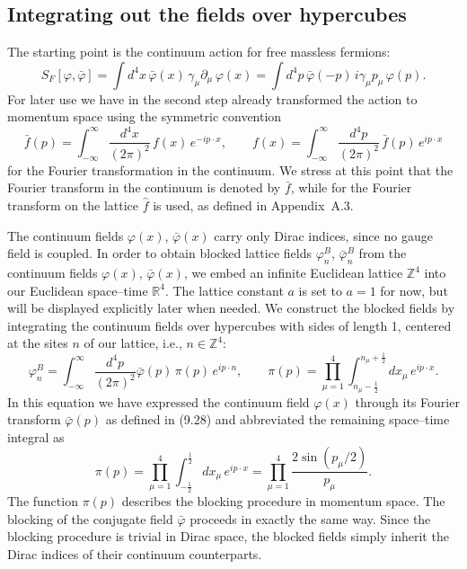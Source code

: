 \subsection{Integrating out the fields over hypercubes}
\label{sec:9.2.1}

The starting point is the continuum action for free massless fermions:
\begin{equation}
  S_F[\varphi,\bar\varphi] = \int d^4x\,\bar\varphi(x)\,\gamma_\mu\partial_\mu\,\varphi(x)
  = \int d^4p\,\bar\varphi(-p)\,i\gamma_\mu p_\mu\,\varphi(p) .
\end{equation}
For later use we have in the second step already transformed the action to
momentum space using the symmetric convention
\begin{equation}
  \bar f(p) = \int_{-\infty}^{\infty}\frac{d^4x}{(2\pi)^2}\,f(x)\,e^{-ip\cdot x} ,
  \qquad
  f(x) = \int_{-\infty}^{\infty}\frac{d^4p}{(2\pi)^2}\,\bar f(p)\,e^{ip\cdot x}
\end{equation}
for the Fourier transformation in the continuum. We stress at this point that
the Fourier transform in the continuum is denoted by $\bar f$, while for the
Fourier transform on the lattice $\hat f$ is used, as defined in Appendix~A.3.

The continuum fields $\varphi(x)$, $\bar\varphi(x)$ carry only Dirac indices,
since no gauge field is coupled. In order to obtain blocked lattice fields
$\varphi^B_n$, $\bar\varphi^B_n$ from the continuum fields $\varphi(x)$,
$\bar\varphi(x)$, we embed an infinite Euclidean lattice $\mathbb{Z}^4$ into
our Euclidean space--time $\mathbb{R}^4$. The lattice constant $a$ is set to
$a = 1$ for now, but will be displayed explicitly later when needed. We
construct the blocked fields by integrating the continuum fields over
hypercubes with sides of length 1, centered at the sites $n$ of our lattice,
i.e., $n \in \mathbb{Z}^4$:
\begin{equation}
  \varphi^B_n = \int_{-\infty}^{\infty}\frac{d^4p}{(2\pi)^2}
    \bar\varphi(p)\,\pi(p)\,e^{ip\cdot n} ,
  \qquad
  \pi(p) = \prod_{\mu=1}^4\int_{n_\mu-\frac{1}{2}}^{n_\mu+\frac{1}{2}}dx_\mu\,e^{ip\cdot x} .
\end{equation}
In this equation we have expressed the continuum field $\varphi(x)$ through
its Fourier transform $\bar\varphi(p)$ as defined in (9.28) and abbreviated
the remaining space--time integral as
\begin{equation}
  \pi(p) = \prod_{\mu=1}^4\int_{-\frac{1}{2}}^{\frac{1}{2}}dx_\mu\,e^{ip\cdot x}
  = \prod_{\mu=1}^4\frac{2\sin(p_\mu/2)}{p_\mu} .
\end{equation}
The function $\pi(p)$ describes the blocking procedure in momentum space. The
blocking of the conjugate field $\bar\varphi$ proceeds in exactly the same
way. Since the blocking procedure is trivial in Dirac space, the blocked
fields simply inherit the Dirac indices of their continuum counterparts.

